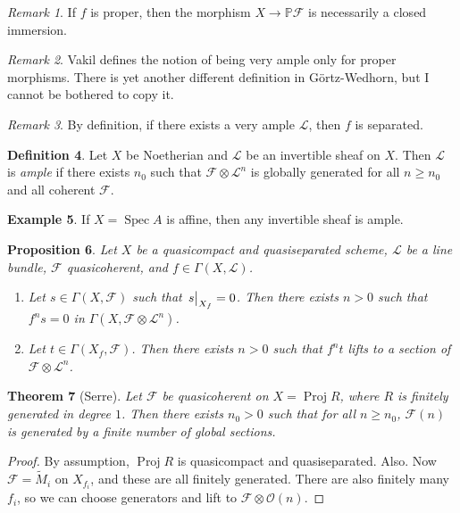 \documentclass[leqno, openany]{memoir}
\newtheorem{thm}{Theorem}[section]
\newtheorem{prop}[thm]{Proposition}
\theoremstyle{definition}
\newtheorem{defn}[thm]{Definition}
\newtheorem{exm}[thm]{Example}
\theoremstyle{remark}
\newtheorem{rmk}[thm]{Remark}
\theoremstyle{plain}
\theoremstyle{definition}
\theoremstyle{remark}
\renewcommand{\P}{\mathbb{P}}
\newcommand{\mc}[1]{\mathcal{#1}}
\newcommand{\wt}[1]{\widetilde{#1}}
\DeclareMathOperator{\Spec}{Spec}
\DeclareMathOperator{\Proj}{Proj}
\begin{document}
\begin{rmk}
    If $f$ is proper, then the morphism $X \to \P \mc{F}$ is necessarily a closed immersion.
\end{rmk}

\begin{rmk}
    Vakil defines the notion of being very ample only for proper morphisms. There is yet another different definition in G\"ortz-Wedhorn, but I cannot be bothered to copy it.
\end{rmk}

\begin{rmk}
    By definition, if there exists a very ample $\mc{L}$, then $f$ is separated.
\end{rmk}

\begin{defn}
    Let $X$ be Noetherian and $\mc{L}$ be an invertible sheaf on $X$. Then $\mc{L}$ is \textit{ample} if there exists $n_0$ such that $\mc{F} \otimes \mc{L}^n$ is globally generated for all $n \geq n_0$ and all coherent $\mc{F}$.
\end{defn}

\begin{exm}
    If $X = \Spec A$ is affine, then any invertible sheaf is ample.
\end{exm}

\begin{prop}
    Let $X$ be a quasicompact and quasiseparated scheme, $\mc{L}$ be a line bundle, $\mc{F}$ quasicoherent, and $f \in \Gamma(X, \mc{L})$. 
    \begin{enumerate}
        \item Let $s \in \Gamma(X, \mc{F})$ such that $\eval{s}_{X_f} = 0$. Then there exists $n > 0$ such that $f^n s = 0$ in $\Gamma(X, \mc{F} \otimes \mc{L}^n)$.
        \item Let $t \in \Gamma(X_f, \mc{F})$. Then there exists $n > 0$ such that $f^n t$ lifts to a section of $\mc{F} \otimes \mc{L}^n$.
    \end{enumerate}
\end{prop}

\begin{thm}[Serre]
    Let $\mc{F}$ be quasicoherent on $X = \Proj R$, where $R$ is finitely generated in degree $1$. Then there exists $n_0 > 0$ such that for all $n \geq n_0$, $\mc{F}(n)$ is generated by a finite number of global sections. 
\end{thm}

\begin{proof}
    By assumption, $\Proj R$ is quasicompact and quasiseparated. Also. Now $\mc{F} = \wt{M}_i$ on $X_{f_i}$, and these are all finitely generated. There are also finitely many $f_i$, so we can choose generators and lift to $\mc{F} \otimes \mc{O}(n)$.
\end{proof}
\end{document}
